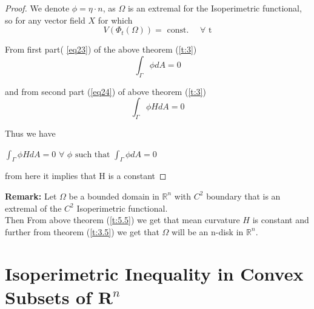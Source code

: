 \documentclass[oneside]{book}
\begin{document}
	
	
	\begin{proof} 
		
		
		
		We denote 
		$\phi = \eta\cdot{n}$,
		as $\Omega$ is an extremal for the Isoperimetric functional, so for any vector field $X$ for which
		\[
		V\left(\Phi_{t}(\Omega)\right)=\text { const. } \quad \forall \text{ t}
		\]
		
		From first part( \ref{eq23}) of the above theorem (\ref{t:3}) \\ 
		
		$$\int_{\Gamma} \phi d A=0$$
		
		
		and from second part (\ref{eq24}) of above theorem (\ref{t:3})
		$$\int_{\Gamma} \phi H d A=0$$
		
		Thus we have \\
		
		\begin{center}
			$ \int_{\Gamma} \phi H d A=0 \hspace{4pt} \forall  \hspace{4pt}\phi \text { such that } \int_{\Gamma} \phi d A=0$ \\ 
		\end{center}
		from here it implies that H is a constant 
	\end{proof}
	
	
	\textbf{Remark: }Let $\Omega$ be a bounded domain in $\mathbb{R}^{n}$ with $C^{2}$ boundary that is an extremal of the $C^{2}$ Isoperimetric functional.\\
	Then
	From above theorem (\ref{t:5.5}) we get that mean curvature $H$ is constant and further from theorem (\ref{t:3.5})    we get that $\Omega$ will be an n-disk in $\mathbb{R}^n$.
	
	
	
	
	
	
	
	
	
	
	\chapter{Isoperimetric Inequality in Convex Subsets of $\mathbf{R}^{n}$ }
	
	\label{chap:c4}
	
	
	
	
	
	
\end{document}
